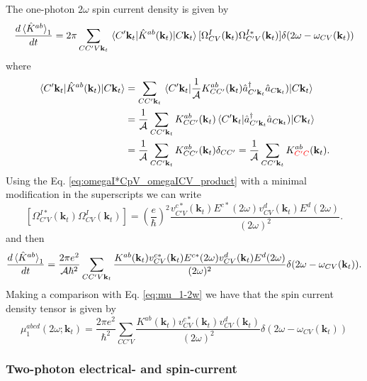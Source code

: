 \documentclass{article}
\newcommand{\kt}{\mathbf{k}_{t}}
\begin{document}
The one-photon $2\omega$ spin current density is given by
\begin{equation}
\frac{d\ev*{\hat{K}^{ab}}_{1}}{dt} = 2 \pi \sum_{CC'V\kt} \mel{C'\kt}
{\hat{K}^{ab}(\kt)}{C\kt} [\Omega^{I}_{CV}(\kt) \Omega^{I*}_{C'V}(\kt)] \delta 
(2\omega - \omega_{CV}(\kt))
\end{equation}
where
\begin{equation}\label{eq:K-matelem}
\begin{split}
\mel{C'\kt}{\hat{K}^{ab}(\kt)}{C\kt} &= \sum_{CC'\kt} \mel{C'\kt}
{\frac{1}{\mathcal{A}} K^{ab}_{CC'}(\kt) 
\hat{a}^{\dag}_{C'\kt} \hat{a}_{C\kt})}{C\kt}  \\
&= \frac{1}{\mathcal{A}} \sum_{CC'\kt} K^{ab}_{CC'}(\kt) \mel{C'\kt}
{\hat{a}^{\dag}_{C'\kt} \hat{a}_{C\kt})}{C\kt}  \\
&= \frac{1}{\mathcal{A}} \sum_{CC'\kt}
K^{ab}_{CC'}(\kt) \delta_{CC'} = \frac{1}{\mathcal{A}} \sum_{CC'\kt}
K^{ab}_{\color{red}{C'C}}(\kt) .
\end{split}
\end{equation}
Using the Eq. \eqref{eq:omegaI*CpV_omegaICV_product} with a minimal
modification in the superscripts we can write
\begin{equation}\label{eq:omegaI*CpV_omegaICV_product-2}
[\Omega^{I*}_{C'V}(\kt) \Omega^{I}_{CV}(\kt)] =
\left( \frac{e}{\hbar} \right)^{2} 
\frac{v^{c*}_{C'V}(\kt)E^{c*}(2\omega)v^{d}_{CV}(\kt)E^{d}(2\omega)}
{(2\omega)^{2}} .
\end{equation}
and then
\begin{equation}
\frac{d\ev*{\hat{K}^{ab}}_{1}}{dt} = \frac{2 \pi e^{2}}{\mathcal{A} \hbar^{2}}
\sum_{CC'V\kt} \frac{K^{ab}(\kt) v^{c*}_{CV}(\kt) E^{c*}(2\omega) 
v^{d}_{CV}(\kt) E^{d}(2\omega) }{(2\omega)^{2}} \delta ({2\omega - 
\omega_{CV}(\kt)}) .
\end{equation}
Making a comparison with Eq. \eqref{eq:mu_1-2w} we have that the spin 
current density tensor is given by
\begin{equation}
\mu^{abcd}_{1} (2\omega;\kt) = \frac{2 \pi e^{2}}{\hbar^{2}}
\sum_{CC'V} \frac{K^{ab}(\kt) v^{c*}_{CV}(\kt) v^{d}_{CV}(\kt)}
{(2\omega)^{2}} \delta ({2\omega - \omega_{CV}(\kt)})
\end{equation}

\subsubsection{Two-photon electrical- and spin-current}
\end{document}
